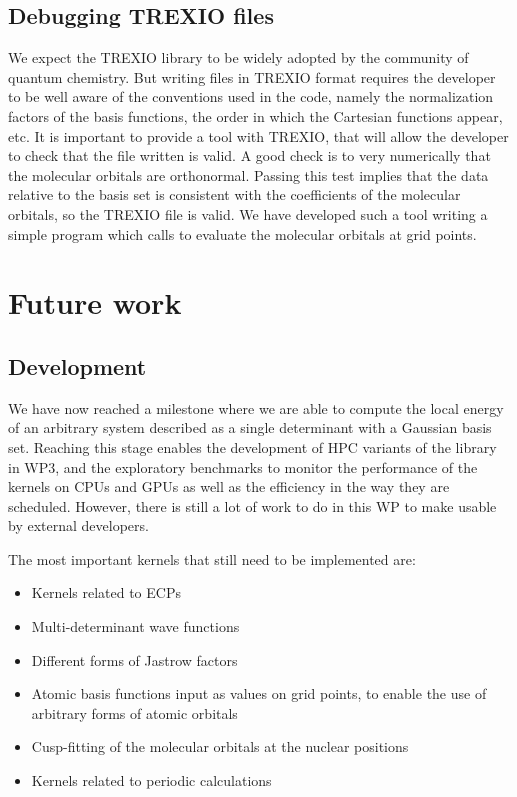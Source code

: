 \subsection{Debugging TREXIO files}

We expect the \ac{TREXIO} library to be widely adopted by the community of
quantum chemistry. But writing files in \ac{TREXIO} format requires the developer
to be well aware of the conventions used in the code, namely the normalization factors
of the basis functions, the order in which the Cartesian functions appear, etc.
It is important to provide a tool with \ac{TREXIO}, that will allow the developer to
check that the file written is valid. A good check is to very numerically that the
molecular orbitals are orthonormal. Passing this test implies that the data
relative to the basis set is consistent with the coefficients of the molecular
orbitals, so the \ac{TREXIO} file is valid. We have developed such a tool 
writing a simple program which calls \QMCkl{} to evaluate the molecular orbitals
at grid points.

\section{Future work}

\subsection{Development}

We have now reached a milestone where we are able to compute the local energy of an
arbitrary system described as a single determinant with a Gaussian basis set.
Reaching this stage enables the development of \ac{HPC} variants of the library in
\ac{WP}3, and the exploratory benchmarks to monitor the performance of the kernels on
CPUs and \acp{GPU} as well as the efficiency in the way they are scheduled.
However, there is still a lot of work to do in this \ac{WP} to make \QMCkl{}
usable by external developers.

The most important kernels that still need to be implemented are:
\begin{itemize}
  \item Kernels related to \acp{ECP}
  \item Multi-determinant wave functions
  \item Different forms of Jastrow factors
  \item Atomic basis functions input as values on grid points, to enable the use of
        arbitrary forms of atomic orbitals
  \item Cusp-fitting of the molecular orbitals at the nuclear positions
  \item Kernels related to periodic calculations
\end{itemize}

